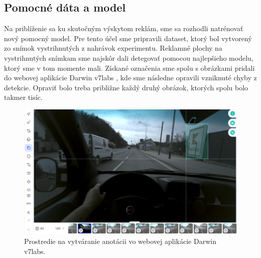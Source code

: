 
\subsection{Pomocné dáta a model}

Na priblíženie sa ku skutočným výskytom reklám, sme sa rozhodli natrénovať nový pomocný model. Pre tento účel sme pripravili dataset, ktorý bol vytvorený zo snímok vystrihnutých z nahrávok experimentu. Reklamné plochy na vystrihnutých snímkam sme najskôr dali detegovať pomocou najlepšieho modelu, ktorý sme v tom momente mali. Získané označenia sme spolu s obrázkami pridali do webovej aplikácie Darwin v7labs \cite{v7}, kde sme následne opravili vzniknuté chyby z detekcie. Opraviť bolo treba približne každý druhý obrázok, ktorých spolu bolo takmer tisíc.

\begin{figure}[ht]
     \centering
     \includegraphics[width=1\textwidth]{images/04/lab.png}
     \caption{Prostredie na vytváranie anotácii vo webovej aplikácie Darwin v7labs.}
     \label{img:lab}
 \end{figure}

